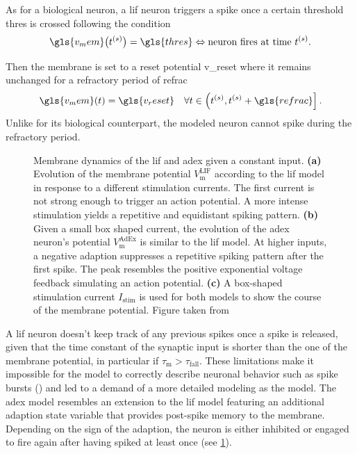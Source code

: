 As for a biological neuron, a \gls{lif} neuron triggers a spike once a certain threshold \gls{thres} is crossed following the condition
\begin{equation*}
\gls{v_mem}\big(t^{(s)}\big) = \gls{thres} \Leftrightarrow \text{neuron fires at time } t^{(s)}.
\end{equation*}

Then the membrane is set to a reset potential \gls{v_reset} where it remains unchanged for a refractory period of \gls{refrac}
\begin{equation*}
\gls{v_mem}(t) = \gls{v_reset} \quad \forall t \in \left(t^{(s)}, t^{(s)} + \gls{refrac}\right].
\end{equation*}
Unlike for its biological counterpart, the modeled neuron cannot spike during the refractory period.

\begin{figure}
	\centering
	\scalebox{0.93}{}
	\caption[Membrane dynamics of the \gls{lif} and \gls{adex} given a constant input.]{Membrane dynamics of the \gls{lif} and \gls{adex} given a constant input. \textbf{(a)} Evolution of the membrane potential $V_\text{m}^\text{LIF}$ according to the \gls{lif} model in response to a different stimulation currents. The first current is not strong enough to trigger an action potential. A more intense stimulation yields a repetitive and equidistant spiking pattern. \textbf{(b)} Given a small box shaped current, the evolution of the \gls{adex} neuron's potential $V_\text{m}^\text{AdEx}$ is similar to the \gls{lif} model. At higher inputs, a negative adaption suppresses a repetitive spiking pattern after the first spike. The peak resembles the positive exponential voltage feedback simulating an action potential. \textbf{(c)} A box-shaped stimulation current $I_\text{stim}$ is used for both models to show the course of the membrane potential. Figure taken from \citealp{stradmann2019msc}}
	\label{lifvsadex}
\end{figure}

A \gls{lif} neuron doesn't keep track of any previous spikes once a spike is released, given that the time constant of the synaptic input is shorter than the one of the membrane potential, in particular if $\tau_\text{m} > \tau_\text{fall}$. These limitations make it impossible for the model to correctly describe neuronal behavior such as spike bursts (\citealp{gerstner2014dynamics}) and led to a demand of a more detailed modeling as the  model. The \gls{adex} model resembles an extension to the \gls{lif} model featuring an additional adaption state variable that provides post-spike memory to the membrane. Depending on the sign of the adaption, the neuron is either inhibited or engaged to fire again after having spiked at least once (see \cref{lifvsadex}).


